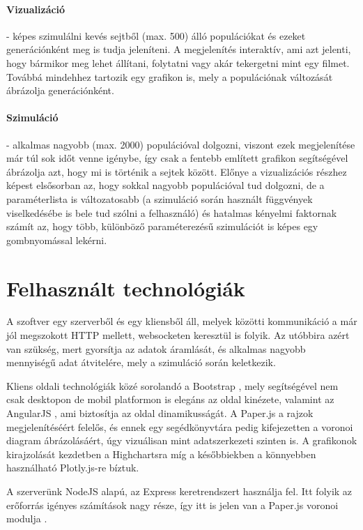 \paragraph{Vizualizáció}- képes szimulálni kevés sejtből (max. 500) álló populációkat és ezeket generációnként meg is tudja jeleníteni. A megjelenítés interaktív, ami azt jelenti, hogy bármikor meg lehet állítani, folytatni vagy akár tekergetni mint egy filmet. Továbbá mindehhez tartozik egy grafikon is, mely a populációnak változását ábrázolja generációnként.

\paragraph{Szimuláció}- alkalmas nagyobb (max. 2000) populációval dolgozni, viszont ezek megjelenítése már túl sok időt venne igénybe, így csak a fentebb említett grafikon segítségével ábrázolja azt, hogy mi is történik a sejtek között. Előnye a vizualizációs részhez képest elsősorban az, hogy sokkal nagyobb populációval tud dolgozni, de a paraméterlista is változatosabb (a szimuláció során használt függvények viselkedésébe is bele tud szólni a felhasználó) és hatalmas kényelmi faktornak számít az, hogy több, különböző paraméterezésű szimulációt is képes egy gombnyomással lekérni.

\section{Felhasznált technológiák}

A szoftver egy szerverből és egy kliensből áll, melyek közötti kommunikáció a már jól megszokott HTTP mellett, websocketen keresztül is folyik. Az utóbbira azért van szükség, mert gyorsítja az adatok áramlását, és alkalmas nagyobb mennyiségű adat átvitelére, mely a szimuláció során keletkezik. 

Kliens oldali technológiák közé sorolandó a Bootstrap \cite{soft:bootstrap}, mely segítségével nem csak desktopon de mobil platformon is elegáns az oldal kinézete, valamint az AngularJS \cite{soft:angular}, ami biztosítja az oldal dinamikusságát. A Paper.js \cite{soft:paper} a rajzok megjelenítéséért felelős, és ennek egy segédkönyvtára \cite{soft:voronoiModule} pedig kifejezetten a voronoi diagram ábrázolásáért, úgy vizuálisan mint adatszerkezeti szinten is. A grafikonok kirajzolását kezdetben a Highchartsra \cite{soft:highcharts} míg a későbbiekben a könnyebben használható Plotly.js-re \cite{soft:plotly} bíztuk.

A szerverünk NodeJS \cite{soft:node} alapú, az Express \cite{soft:express} keretrendszert használja fel. Itt folyik az erőforrás igényes számítások nagy része, így itt is jelen van a Paper.js voronoi modulja \cite{soft:voronoiModule}.

